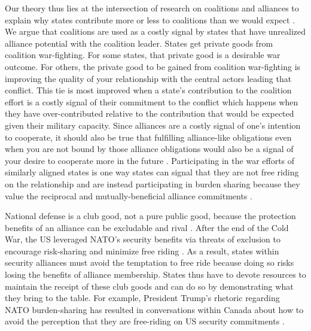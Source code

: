 \documentclass[12pt,letterpaper]{article}
\begin{document}
	Our theory thus lies at the intersection of research on coalitions and alliances to explain why states contribute more or less to coalitions than we would expect \citep{saideman_ambivalentcoalitiondoing_2016}. We argue that coalitions are used as a costly signal by states that  have unrealized alliance potential with the coalition leader. States get private goods from coalition war-fighting. For some states, that private good is a desirable war outcome. For others, the private good to be gained from coalition war-fighting is improving the quality of your relationship with the central actors leading that conflict. This tie is most improved when a state's contribution to the coalition effort is a costly signal of their commitment to the conflict which happens when they have over-contributed relative to the contribution that would be expected given their military capacity. Since alliances are a costly signal of one's intention to cooperate, it should also be true that fulfilling alliance-like obligations even when you are not bound by those alliance obligations would also be a signal of your desire to cooperate more in the future \citep[704]{warren_geometrysecuritymodeling_2010}. Participating in the war efforts of similarly aligned states is one way states can signal that they are not free riding on the relationship and are instead participating in burden sharing because they value the reciprocal and mutually-beneficial alliance commitments \citep[225-227]{maskaliunaite_sharingburdenassessing_2014}.

	National defense is a club good, not a pure public good, because the protection benefits of an alliance can be excludable and rival \citep[336]{sandler_clubtheorythirty_1997}. After the end of the Cold War, the US leveraged NATO's security benefits via threats of exclusion to encourage risk-sharing and minimize free riding \citep[324-325]{ringsmose_natoburdensharingredux_2010}. As a result, states within security alliances must avoid the temptation to free ride because doing so risks losing the benefits of alliance membership. States thus have to devote resources to maintain the receipt of these club goods and can do so by demonstrating what they bring to the table. For example, President Trump's rhetoric regarding NATO burden-sharing has resulted in conversations within Canada about how to avoid the perception that they are free-riding on US security commitments \citep[143]{mckay_whycanadabest_2018}.
	
\end{document}
